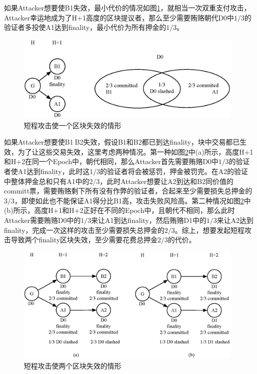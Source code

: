 如果Attacker想要使B1失效，最小代价的情况如图\ref{fig:revert1}，就相当一次双重支付攻击，Attacker幸运地成为了H+1高度的区块提议者，那么至少需要贿赂朝代D0中$1/3$的验证者多投使A1达到finality，最小代价为所有押金的$1/3$。

\begin{figure}[h]
\centering
\includegraphics[width=11cm]{./figs/revert1}
\caption{短程攻击使一个区块失效的情形}
\label{fig:revert1}
\end{figure}

如果Attacker想要使B1$~$B2失效，假设B1和B2都已到达finality，块中交易都已生效，为了让这些交易失效，这里考虑两种情况。第一种如图\ref{fig:revert2}中(a)所示，高度H+1和H+2在同一个Epoch中，朝代相同，那么Attacker首先需要贿赂D0中$1/3$的验证者使A1达到finality，此时这$1/3$的验证者将会被惩罚，押金被罚完。在A2的验证中整体押金总和只有A1中的$2/3$，此时Attacker想要让A2到达和B2同价值的committ票，需要贿赂剩下所有没有作弊的验证者，合起来至少需要损失总押金的$3/3$，即使如此也不能保证A1得分比B1高，攻击失败风险高。第二种情况如图\ref{fig:revert2}中(b)所示，高度H+1和H+2正好在不同的Epoch中，且朝代不相同，那么此时Attacker需要贿赂D0中的$1/3$来让A1到达finality，然后贿赂D1中的$1/3$来让A2达到finality，完成一次这样的攻击至少需要损失总押金的$2/3$。综上，想要发起短程攻击导致两个finality区块失效，至少需要花费总押金$2/3$的代价。

\begin{figure}[h]
\centering
\includegraphics[width=11cm]{./figs/revert2}
\caption{短程攻击使两个区块失效的情形}
\label{fig:revert2}
\end{figure}


